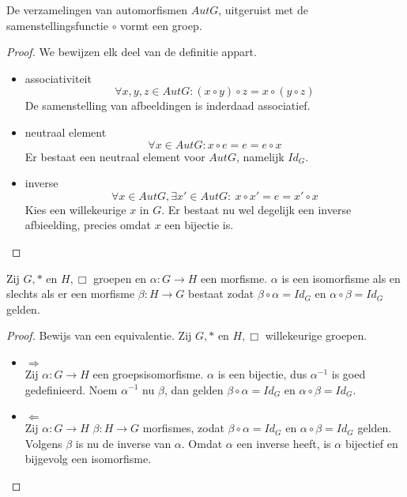 \documentclass[main.tex]{subfiles}
\begin{document}
\begin{st}
  De verzamelingen van automorfismen $Aut G$, uitgeruist met de samenstellingsfunctie $\circ$ vormt een groep.

  \begin{proof}
    We bewijzen elk deel van de definitie appart.
    \begin{itemize}
    \item associativiteit
      \[ \forall x, y, z \in Aut G: (x \circ y) \circ z = x \circ (y \circ z) \] 
      De samenstelling van afbeeldingen is inderdaad associatief.
    \item neutraal element
      \[ \forall x \in Aut G: x \circ e = e = e \circ x \]
      Er bestaat een neutraal element voor $Aut G$, namelijk $Id_{G}$.
    \item inverse
      \[ \forall x \in Aut G, \exists x' \in Aut G:\ x \circ x' = e = x' \circ x \]
      Kies een willekeurige $x$ in $G$. Er bestaat nu wel degelijk een inverse afbieelding, precies omdat $x$ een bijectie is.
    \end{itemize}
  \end{proof}
\end{st}

\begin{st}
  Zij $G,*$ en $H,\Box$ groepen en $\alpha: G \rightarrow H$ een morfisme.
  $\alpha$ is een isomorfisme als en slechts als er een morfisme $\beta: H \rightarrow G$ bestaat zodat $\beta \circ \alpha = Id_{G}$ en $\alpha \circ \beta = Id_{G}$ gelden.

  \begin{proof}
    Bewijs van een equivalentie.
    Zij $G,*$ en $H,\Box$ willekeurige groepen. 
    \begin{itemize}
    \item $\Rightarrow$\\
      Zij $\alpha: G \rightarrow H$ een groepsisomorfisme.
      $\alpha$ is een bijectie, dus $\alpha^{-1}$ is goed gedefinieerd.
      Noem $\alpha^{-1}$ nu $\beta$, dan gelden $\beta \circ \alpha = Id_{G}$ en $\alpha \circ \beta = Id_{G}$.
    \item $\Leftarrow$\\
      Zij $\alpha: G \rightarrow H$ $\beta: H \rightarrow G$ morfismes, zodat $\beta \circ \alpha = Id_{G}$ en $\alpha \circ \beta = Id_{G}$ gelden.
      Volgens $\beta$ is nu de inverse van $\alpha$.
      Omdat $\alpha$ een inverse heeft, is $\alpha$ bijectief en bijgevolg een isomorfisme.
    \end{itemize}
  \end{proof}
\end{st}
\end{document}
